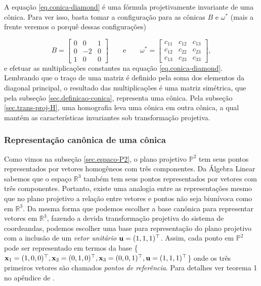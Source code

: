 A equação \ref{eq.conica-diamond} é uma fórmula projetivamente invariante de uma cônica. Para ver isso, basta tomar a configuração para as cônicas $B$ e $\omega^*$ (mais a frente veremos o porquê dessas configurações)

\begin{equation*}
B=
\begin{bmatrix}
0&0&1\\
0&-2&0\\
1&0&0
\end{bmatrix}
\qquad\text{e}\qquad
\omega^*=
\begin{bmatrix}
c_{11}&c_{12}&c_{13}\\
c_{12}&c_{22}&c_{23}\\
c_{13}&c_{23}&c_{33}
\end{bmatrix},
\end{equation*} 
e efetuar as multiplicações constantes na equação \ref{eq.conica-diamond}. Lembrando que o traço de uma matriz é definido pela soma dos elementos da diagonal principal, o resultado das multiplicações é uma matriz simétrica, que pela subseção \ref{sec.definicao-conica}, representa uma cônica. Pela subseção \ref{sec.trans-proj-H}, uma homografia leva uma cônica em outra cônica, a qual mantém as características invariantes sob transformação projetiva.

\subsubsection{Representação canônica de uma cônica}\label{sec.forma-canonica-B}

Como vimos na subseção \ref{sec.espaco-P2}, o plano projetivo $\mathbb{P}^2$ tem seus pontos representados por vetores homogêneos com três componentes. Da Álgebra Linear sabemos que o espaço $\mathbb{R}^3$ também tem seus pontos representados por vetores com três componentes. Portanto, existe uma analogia entre as representações mesmo que no plano projetivo a relação entre vetores e pontos não seja biunívoca como em $\mathbb{R}^3$. Da mesma forma que podemos escolher a base canônica para representar vetores em $\mathbb{R}^3$, fazendo a devida transformação projetiva do sistema de coordeandas, podemos escolher uma base para representação do plano projetivo com a inclusão de um \textit{vetor unitário} ${\bf u}=(1,1,1)^\top$. Assim, cada ponto em $\mathbb{P}^2$ pode ser representado em termos da base \{$\mathbf{x}_1=(1,0,0)^\top,\mathbf{x}_2=(0,1,0)^\top,\mathbf{x}_3=(0,0,1)^\top,{\bf u}=(1,1,1)^\top$\} onde os três primeiros vetores são chamados {\it pontos de referência}. Para detalhes ver teorema 1 no apêndice  de \citep{kneebone}.

